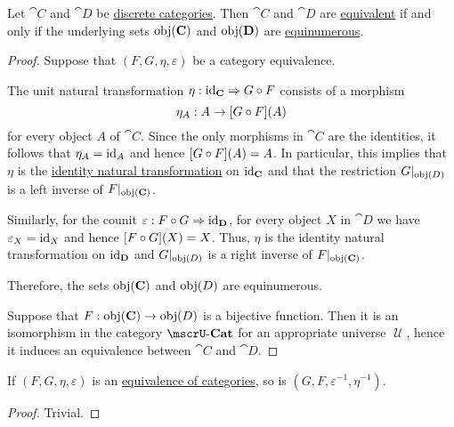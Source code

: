 \begin{proposition}\label{thm:discrete_category_equivalence}
  Let \( \cat{C} \) and \( \cat{D} \) be \hyperref[def:discrete_category]{discrete categories}. Then \( \cat{C} \) and \( \cat{D} \) are \hyperref[def:category_equivalence]{equivalent} if and only if the underlying sets \( \operatorname{obj}(\operatorname{\mathbf{C}}) \) and \( \operatorname{obj}(\operatorname{\mathbf{D}}) \) are \hyperref[def:equinumerosity]{equinumerous}.
\end{proposition}
\begin{proof}
  \SufficiencySubProof Suppose that \( (F, G, \eta, \varepsilon) \) be a category equivalence.

  The unit natural transformation \( \eta: \id_{\cat{C}} \Rightarrow G \bincirc F \) consists of a morphism
  \begin{equation*}
    \eta_A: A \to [G \bincirc F](A)
  \end{equation*}
  for every object \( A \) of \( \cat{C} \). Since the only morphisms in \( \cat{C} \) are the identities, it follows that \( \eta_A = \operatorname{id}_A \) and hence \( [G \bincirc F](A) = A \). In particular, this implies that \( \eta \) is the \hyperref[eq:def:functor_category/identity]{identity natural transformation} on \( \operatorname{id}_{\operatorname{\mathbf{C}}} \) and that the restriction \( G\vert_{\operatorname{obj}(D)} \) is a left inverse of \( F\vert_{\operatorname{obj}(\operatorname{\mathbf{C}})} \).

  Similarly, for the counit \( \varepsilon: F \bincirc G \Rightarrow \id_{\cat{D}} \), for every object \( X \) in \( \cat{D} \) we have \( \varepsilon_X = \operatorname{id}_X \) and hence \( [F \bincirc G](X) = X \). Thus, \( \eta \) is the identity natural transformation on \( \operatorname{id}_{\operatorname{\mathbf{D}}} \) and \( G\vert_{\operatorname{obj}(D)} \) is a right inverse of \( F\vert_{\operatorname{obj}(\operatorname{\mathbf{C}})} \).

  Therefore, the sets \( \operatorname{obj}(\operatorname{\mathbf{C}}) \) and \( \operatorname{obj}(D) \) are equinumerous.

  \NecessitySubProof Suppose that \( F: \operatorname{obj}(\operatorname{\mathbf{C}}) \to \operatorname{obj}(D) \) is a bijective function. Then it is an isomorphism in the category \( \ucat{Cat} \) for an appropriate universe \( \mscrU \), hence it induces an equivalence between \( \cat{C} \) and \( \cat{D} \).
\end{proof}

\begin{proposition}\label{thm:inverse_of_category_equivalence}
  If \( (F, G, \eta, \varepsilon) \) is an \hyperref[def:category_equivalence]{equivalence of categories}, so is \( (G, F, \varepsilon^{-1}, \eta^{-1}) \).
\end{proposition}
\begin{proof}
  Trivial.
\end{proof}

